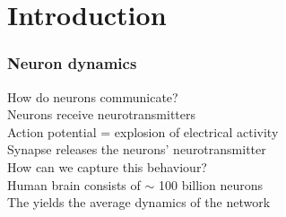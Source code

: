 
\section{Introduction}
\begin{frame}
\frametitle{Neuron dynamics}
How do neurons communicate? \\
\tabitem Neurons receive neurotransmitters \\
\tabitem Action potential = explosion of electrical activity \\
\tabitem Synapse releases the neurons' neurotransmitter \\ [0.5cm]

How can we capture this behaviour? \\
\tabitem Human brain consists of $\sim$ 100 billion neurons \\
\tabitem The \MFR yields the average dynamics of the network 
\end{frame}



